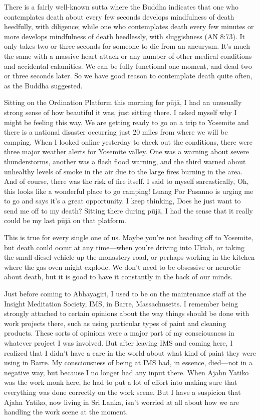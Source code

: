 
There is a fairly well-known sutta where the Buddha indicates that one 
who contemplates death about every few seconds develops mindfulness of 
death heedfully, with diligence; while one who contemplates death every 
few minutes or more develops mindfulness of death heedlessly, with 
sluggishness (AN 8:73). It only takes two or three seconds for someone 
to die from an aneurysm. It's much the same with a massive heart attack 
or any number of other medical conditions and accidental calamities. We 
can be fully functional one moment, and dead two or three seconds 
later. So we have good reason to contemplate death quite often, as the 
Buddha suggested.

Sitting on the Ordination Platform this morning for pūjā, I had an 
unusually strong sense of how beautiful it was, just sitting there. I 
asked myself why I might be feeling this way. We are getting ready to 
go on a trip to Yosemite and there is a national disaster occurring 
just 20 miles from where we will be camping. When I looked online 
yesterday to check out the conditions, there were three major weather 
alerts for Yosemite valley. One was a warning about severe 
thunderstorms, another was a flash flood warning, and the third warned 
about unhealthy levels of smoke in the air due to the large fires 
burning in the area. And of course, there was the risk of fire itself. 
I said to myself sarcastically, Oh, this looks like a wonderful place 
to go camping! Luang Por Pasanno is urging me to go and says it's a 
great opportunity. I keep thinking, Does he just want to send me off to 
my death? Sitting there during pūjā, I had the sense that it really 
could be my last pūjā on that platform.

This is true for every single one of us. Maybe you're not heading off 
to Yosemite, but death could occur at any time---when you're driving 
into Ukiah, or taking the small diesel vehicle up the monastery road, 
or perhaps working in the kitchen where the gas oven might explode. We 
don't need to be obsessive or neurotic about death, but it is good to 
have it constantly in the back of our minds.

Just before coming to Abhayagiri, I used to be on the maintenance staff 
at the Insight Meditation Society, IMS, in Barre, Massachusetts. I 
remember being strongly attached to certain opinions about the way 
things should be done with work projects there, such as using 
particular types of paint and cleaning products. These sorts of 
opinions were a major part of my consciousness in whatever project I 
was involved. But after leaving IMS and coming here, I realized that I 
didn't have a care in the world about what kind of paint they were 
using in Barre. My consciousness of being at IMS had, in essence, 
died---not in a negative way, but because I no longer had any input 
there. When Ajahn Yatiko was the work monk here, he had to put a lot of 
effort into making sure that everything was done correctly on the work 
scene. But I have a suspicion that Ajahn Yatiko, now living in Sri 
Lanka, isn't worried at all about how we are handling the work scene at 
the moment.

